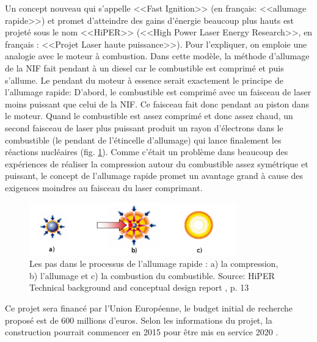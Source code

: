 \documentclass[12pt,a4paper]{article}
\begin{document}
Un concept nouveau qui s'appelle <<Fast Ignition>> (en français: <<allumage ra\-pide>>) et promet d'atteindre des gains d'énergie beaucoup plus hauts est projeté sous le nom <<HiPER>> (<<High Power Laser Energy Research>>, en français : <<Projet Laser haute puissance>>). Pour l'expliquer, on emploie une analogie avec le moteur à combustion. Dans cette modèle, la méthode d'allumage de la NIF fait pendant à un diesel car le combustible est comprimé et puis s'allume. Le pendant du moteur à essence serait exactement le principe de l'allumage ra\-pide: D'abord, le combustible est comprimé avec un faisceau de laser moins puissant que celui de la NIF. Ce faisceau fait donc pendant au piston dans le moteur. Quand le combustible est assez comprimé et donc assez chaud, un second faisceau de laser plus puissant produit un rayon d'électrons dans le combustible (le pendant de l'étincelle d'allumage) qui lance finalement les réactions nucléaires (fig. \ref{fig:FastStages}). Comme c'était un problème dans beaucoup des expériences de réaliser la compression autour du combustible assez symétrique et puissant, le concept de l'allumage ra\-pide promet un avantage grand à cause des exigences moindres au faisceau du laser comprimant.
\begin{figure}[htb]
	\centering \includegraphics[width=0.8\textwidth]{images/FastStages}
	\caption{Les pas dans le processus de l'allumage ra\-pide : a) la compression, b) l'allumage et c) la combustion du combustible. Source: HiPER Technical background and conceptual design report \cite{hiper}, p. 13}
	\label{fig:FastStages}
\end{figure}

Ce projet sera financé par l'Union Européenne, le budget initial de recherche proposé est de 600 millions d'euros. Selon les informations du projet, la construction pourrait commencer en 2015 pour être mis en service 2020 \cite{hiper}.
\end{document}
